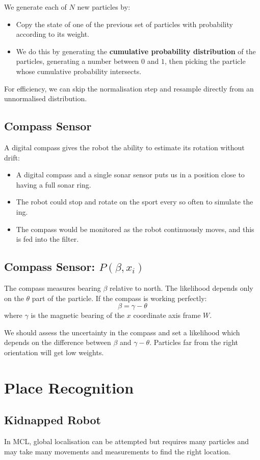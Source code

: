 \documentclass[11pt]{article}
\begin{document}
We generate each of $N$ new particles by:
\begin{itemize}
  \item Copy the state of one of the previous set of particles with probability according to its weight.
  \item We do this by generating the \textbf{cumulative probability distribution} of the particles, generating a number between $0$ and $1$, then picking the particle whose cumulative probability intersects.
\end{itemize}

For efficiency, we can skip the normalisation step and resample directly from an unnormalised distribution.

\subsection{Compass Sensor}
A digital compass gives the robot the ability to estimate its rotation without drift:
\begin{itemize}
  \item A digital compass and a single sonar sensor puts us in a position close to having a full sonar ring.
  \item The robot could stop and rotate on the sport every so often to simulate the ing.
  \item The compass would be monitored as the robot continuously moves, and this is fed into the filter.
\end{itemize}

\subsection{Compass Sensor: $P(\beta, x_i)$}
The compass measures bearing $\beta$ relative to north.
The likelihood depends only on the $\theta$ part of the particle.
If the compass is working perfectly:
\[
  \beta = \gamma - \theta
\]
where $\gamma$ is the magnetic bearing of the $x$ coordinate axis frame $W$.

We should assess the uncertainty in the compass and set a likelihood which depends on the difference between $\beta$ and $\gamma - \theta$.
Particles far from the right orientation will get low weights.

\section{Place Recognition}
\subsection{Kidnapped Robot}
In MCL, global localisation can be attempted but requires many particles and may take many movements and measurements to find the right location.
\end{document}
